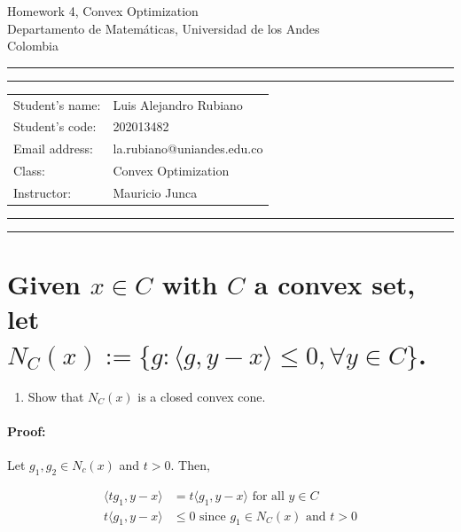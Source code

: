 \documentclass[10pt]{article}
\makeatletter
\newcommand{\studentname}{Luis Alejandro Rubiano}
\newcommand{\studentnumber}{202013482}
\newcommand{\researchcentre}{la.rubiano@uniandes.edu.co}
\newcommand{\projecttitle}{Convex Optimization}
\newcommand{\supervisor}{Mauricio Junca}
\makeatother
\begin{document}
\begin{center}
{\Huge{Homework 4, Convex Optimization}} \\
\vspace{2mm}
{\Large{Departamento de Matemáticas, Universidad de los Andes}} \\
\vspace{1mm}
{\Large{Colombia}}
\end{center}

\vspace{5mm}
\hrule
\vspace{1mm}
\hrule

\vspace{3mm}
\begin{tabular}{ll} 
Student's name:           	        & {\studentname}   \\ 
Student's code: 	        & {\studentnumber} \\ 
Email address: 	        & {\researchcentre}  \\ 
Class: 	& {\projecttitle}  \\ 
Instructor: 	    & {\supervisor}  \\ 
\end{tabular}

\vspace{3mm}
\hrule
\vspace{1mm}
\hrule

\hfill \break %

\section{Given $x \in C$ with $C$ a convex set, let $N_C(x) := \{ g : \langle g, y - x \rangle \leq 0, \forall y \in C \}$. }

\begin{enumerate}[label=(\alph*)]
  \item Show that $N_C(x)$ is a closed convex cone.
\end{enumerate}

\paragraph{Proof:}

Let $g_1, g_2 \in N_c(x)$ and $t >0$. Then, 

\begin{align*}
  \langle t g_1, y - x \rangle &= t \langle g_1, y - x \rangle \text{ for all } y \in C\\
  t \langle g_1, y - x \rangle &\leq 0 \text{ since } g_1 \in N_C(x) \text{ and } t > 0\\
\end{align*}
\end{document}
